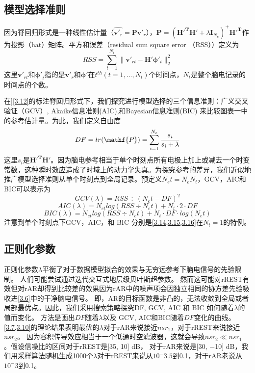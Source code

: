 \subsection{模型选择准则}
因为脊回归形式是一种线性估计量（$\hat{\mathbf{v}\prime_{r}}={\mathbf{Pv}\prime_{r}}$），$\mathbf{P}=(\mathbf{H\prime^{T}}\mathbf{H}\prime+\lambda\mathbf{I}_{N_{e}})^{+}\mathbf{H\prime^{T}}$作为投影（hat）矩阵。平方和误差（residual sum square error （RSS））定义为
\begin{equation}
RSS=\sum_{t=1}^{N_{t}}\lVert\mathbf{v}\prime_{rt}-\mathbf{H}\prime\mathbf{\phi}\prime_{t}\rVert_2^2
\end{equation}
这里$\mathbf{v}\prime_{rt}$和$\mathbf{\phi\prime}_{t}$指的是$\mathbf{v}\prime_{r}$和$\mathbf{\phi\prime}$在$t^{th}(t=1,...,N_{t})$个时间点，$N_{t}$是整个脑电记录的时间点的个数。

在]\eqref{3.12}的标注脊回归形式下，我们探究进行模型选择的三个信息准则：广义交叉验证（GCV）, Akaike信息准则(AIC),和Bayesian信息准则(BIC) 来比较图表一中的参考估计量。为此，我们定义自由度
\begin{equation}
DF=tr(\mathf{P})=\sum_{i=1}^{N_{e}}\dfrac{s_i}{s_i+\lambda}
\end{equation}
这里${s_i}$是$\mathbf{H\prime^{T}H\prime}$。因为脑电参考相当于单个时刻点所有电极上加上或减去一个时变常数，这种瞬时效应造成了时域上的动力学失真。为探究参考的差异，我们近似地推广模型选择准则从单个时刻点到全局记录。预定义$N_et=N_{e}N_t$，GCV，AIC和BIC可以表示为
\begin{equation}\label{3.14}
GCV(\lambda)=RSS\div(N_et-DF)^2
\end{equation}
\begin{equation}\label{3.15}
AIC(\lambda)=N_{et}log(RSS\div{N_et})+N_{t}·2·DF
\end{equation}
\begin{equation}\label{3.15}
BIC(\lambda)=N_{et}log(RSS\div{N_et})+N_{t}·DF·log(N_et)
\end{equation}
注意到单个时刻点下GCV，AIC，和 BIC 分别是\eqref{3.14,3.15,3.16}在$N_t=1$的特例。
\subsection{正则化参数}
正则化参数$\lambda$平衡了对于数据模型拟合的效果与无穷远参考下脑电信号的先验限制。 
人们可能尝试通过迭代交互式地层级贝叶斯超参数。 然而这可能对rREST有效但对rAR却得到比较差的效果因为rAR中的噪声项会因独立相同的协方差先验吸收进\eqref{3.6}中的干净脑电信号。 即，AR的目标函数是非凸的，无法收敛到全局或者局部最优点。因此，我们采用搜索策略探究DF, GCV, AIC 和
BIC 如何随着$\lambda$的值而变化。 方法是画出$DF$随着$\lambda$以及 GCV, AIC和BIC随着$DF$变化的曲线。\eqref{3.7,3.10}的理论结果表明最优的$\lambda$对于rAR来说接近$nsr_1$，对于rREST来说接近$nsr_2$。 因为容积传导效应相当于一个低通时空滤波器，这就会导致$nsr_2 ≪ nsr_1$
。假设信噪比的区间对于rREST是[35, 10] dB， 对于rAR来说是[30, −10] dB，我们用采样算法随机生成1000个$\lambda$对于rREST来说从$10^-3.5$到0.1，对于rAR老说从$10^-3$到0.1。

